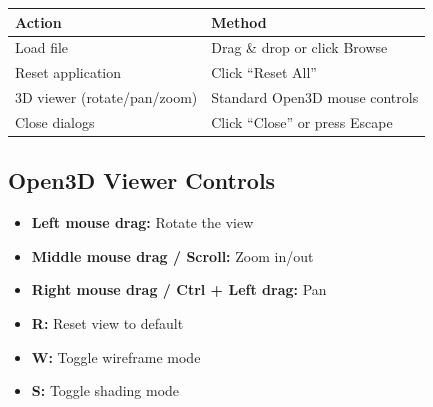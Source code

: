 \documentclass[12pt,a4paper]{article}
\begin{document}
\begin{table}[H]
\centering
\begin{tabular}{ll}
\toprule
\textbf{Action} & \textbf{Method} \\
\midrule
Load file & Drag \& drop or click Browse \\
Reset application & Click ``Reset All'' \\
3D viewer (rotate/pan/zoom) & Standard Open3D mouse controls \\
Close dialogs & Click ``Close'' or press Escape \\
\bottomrule
\end{tabular}
\end{table}

\subsection{Open3D Viewer Controls}
\begin{itemize}
  \item \textbf{Left mouse drag:} Rotate the view
  \item \textbf{Middle mouse drag / Scroll:} Zoom in/out
  \item \textbf{Right mouse drag / Ctrl + Left drag:} Pan
  \item \textbf{R:} Reset view to default
  \item \textbf{W:} Toggle wireframe mode
  \item \textbf{S:} Toggle shading mode
\end{itemize}
\end{document}
